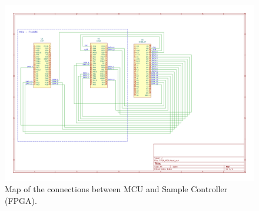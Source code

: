   
\begin{figure}[H]
    \centering
    \includegraphics[clip, trim=40 130 190 40,width=1.0\textwidth]{Appendix/Figures/FPGA_MCU_PinOut.pdf}
    \caption{Map of the connections between MCU and Sample Controller (FPGA).}
    \label{fig_App_MCU_FPGA_PinMap}
\end{figure}

